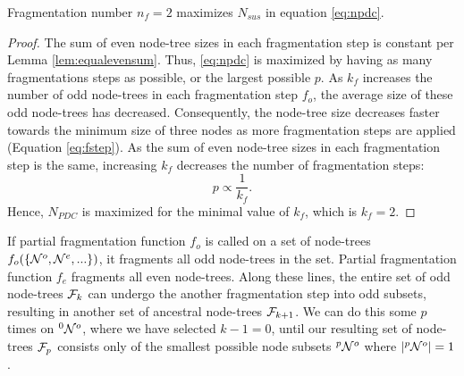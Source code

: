 \begin{theorem}\label{the:fragnumber}
  Fragmentation number $n_f=2$ maximizes $N_{sus}$ in equation \eqref{eq:npdc}.
\end{theorem}
\begin{proof}
  The sum of even node-tree sizes in each fragmentation step is constant per Lemma \ref{lem:equalevensum}. Thus, \eqref{eq:npdc} is maximized by having as many fragmentations steps as possible, or the largest possible $p$.  As $k_f$ increases the number of odd node-trees in each fragmentation step $f_o$, the average size of these odd node-trees has decreased. Consequently, the node-tree size decreases faster towards the minimum size of three nodes as more fragmentation steps are applied (Equation \eqref{eq:fstep}). As the sum of even node-tree sizes in each fragmentation step is the same, increasing $k_f$ decreases the number of fragmentation steps:
  \begin{equation}
    p \propto \frac{1}{k_f}.
  \end{equation}
  Hence, $N_{PDC}$ is maximized for the minimal value of $k_f$, which is $k_f = 2$.
\end{proof}


% 

If partial fragmentation function $f_o$ is called on a set of node-trees $f_o(\{\mathcal{N}^o, \mathcal{N}^e, ...\})$, it fragments all odd node-trees in the set. Partial fragmentation function $f_e$ fragments all even node-trees. Along these lines, the entire set of odd node-trees $\mathcal{F}_k$ can undergo the another fragmentation step into odd subsets, resulting in another set of ancestral node-trees $\mathcal{F}_{k+1}$. We can do this some $p$ times on ${}^{0}\mathcal{N}^o$, where we have selected $k-1=0$, until our resulting set of node-trees $\mathcal{F}_{p}$ consists only of the smallest possible node subsets ${}^{p}\mathcal{N}^o$ where $|{}^{p}\mathcal{N}^o|=1$.


